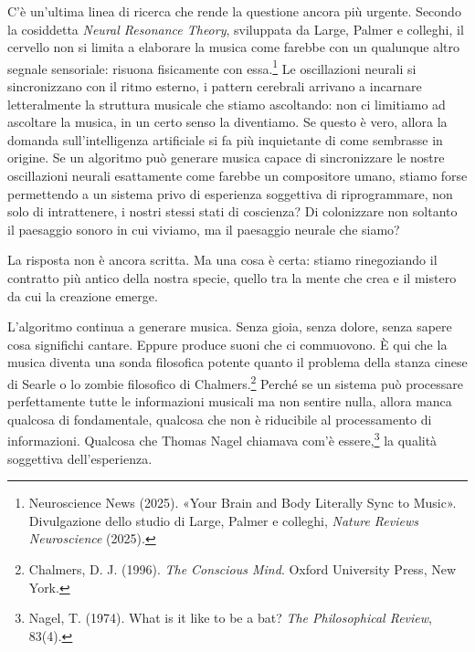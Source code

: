 \begin{center}
	\label{fig:musica_langer_simbolo}
\end{center}

C'\`{e} un'ultima linea di ricerca che rende la questione ancora pi\`{u} urgente. Secondo la cosiddetta \textit{Neural Resonance Theory}, sviluppata da Large, Palmer e colleghi, il cervello non si limita a elaborare la musica come farebbe con un qualunque altro segnale sensoriale: risuona fisicamente con essa.\footnote{Neuroscience News (2025). «Your Brain and Body Literally Sync to Music». Divulgazione dello studio di Large, Palmer e colleghi, \textit{Nature Reviews Neuroscience} (2025).} Le oscillazioni neurali si sincronizzano con il ritmo esterno, i pattern cerebrali arrivano a incarnare letteralmente la struttura musicale che stiamo ascoltando: non ci limitiamo ad ascoltare la musica, in un certo senso la diventiamo. Se questo \`{e} vero, allora la domanda sull'intelligenza artificiale si fa pi\`{u} inquietante di come sembrasse in origine. Se un algoritmo pu\`{o} generare musica capace di sincronizzare le nostre oscillazioni neurali esattamente come farebbe un compositore umano, stiamo forse permettendo a un sistema privo di esperienza soggettiva di riprogrammare, non solo di intrattenere, i nostri stessi stati di coscienza? Di colonizzare non soltanto il paesaggio sonoro in cui viviamo, ma il paesaggio neurale che siamo?

La risposta non \`{e} ancora scritta. Ma una cosa \`{e} certa: stiamo rinegoziando il contratto pi\`{u} antico della nostra specie, quello tra la mente che crea e il mistero da cui la creazione emerge.

L'algoritmo continua a generare musica. Senza gioia, senza dolore, senza sapere cosa significhi cantare. Eppure produce suoni che ci commuovono. \`{E} qui che la musica diventa una sonda filosofica potente quanto il problema della stanza cinese di Searle o lo zombie filosofico di Chalmers.\footnote{Chalmers, D. J. (1996). \textit{The Conscious Mind}. Oxford University Press, New York.} Perch\'{e} se un sistema pu\`{o} processare perfettamente tutte le informazioni musicali ma non sentire nulla, allora manca qualcosa di fondamentale, qualcosa che non \`{e} riducibile al processamento di informazioni. Qualcosa che Thomas Nagel chiamava com'\`{e} essere,\footnote{Nagel, T. (1974). What is it like to be a bat? \textit{The Philosophical Review}, 83(4).} la qualit\`{a} soggettiva dell'esperienza.

